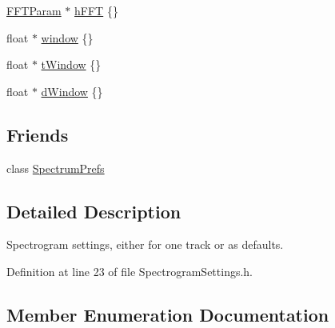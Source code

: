 \begin{DoxyCompactItemize}
\item 
\hyperlink{struct_f_f_t_param}{F\+F\+T\+Param} $\ast$ \hyperlink{class_spectrogram_settings_a5bdb3fce0f0ee66e99975772f81f951b}{h\+F\+FT} \{\}
\item 
float $\ast$ \hyperlink{class_spectrogram_settings_a1fdc24b77ae72f754274825cee5e288f}{window} \{\}
\item 
float $\ast$ \hyperlink{class_spectrogram_settings_acb25f1d76f20e850da96b0fe784f92ce}{t\+Window} \{\}
\item 
float $\ast$ \hyperlink{class_spectrogram_settings_ab7e880825e7d4543c7d6d132c7ee1294}{d\+Window} \{\}
\end{DoxyCompactItemize}
\subsection*{Friends}
\begin{DoxyCompactItemize}
\item 
class \hyperlink{class_spectrogram_settings_a6ea05efbbc3c535207069dda3fc44dea}{Spectrum\+Prefs}
\end{DoxyCompactItemize}


\subsection{Detailed Description}
Spectrogram settings, either for one track or as defaults. 

Definition at line 23 of file Spectrogram\+Settings.\+h.



\subsection{Member Enumeration Documentation}
